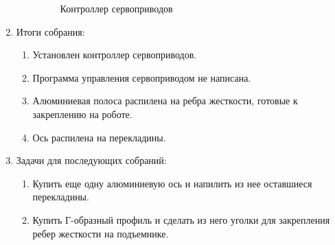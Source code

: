 \begin{enumerate}
\begin{enumerate}
\begin{figure}[H]
\begin{minipage}[h]{0.5\linewidth}
      		\caption{Контроллер сервоприводов}
      	\end{minipage}
      \end{figure}
      
    \end{enumerate}
    
	\item Итоги собрания: 
	\begin{enumerate}
	  \item Установлен контроллер сервоприводов.
	  
      \item Программа управления сервоприводом не написана.
      
      \item Алюминиевая полоса распилена на ребра жесткости, готовые к закреплению на роботе.
      
      \item Ось распилена на перекладины.
      
    \end{enumerate}
    
	\item Задачи для последующих собраний:
	\begin{enumerate}
	  \item Купить еще одну алюминиевую ось и напилить из нее оставшиеся перекладины.
	  
	  \item Купить Г-образный профиль и сделать из него уголки для закрепления ребер жесткости на подъемнике.

    \end{enumerate}     
\end{enumerate}

\fillpage
